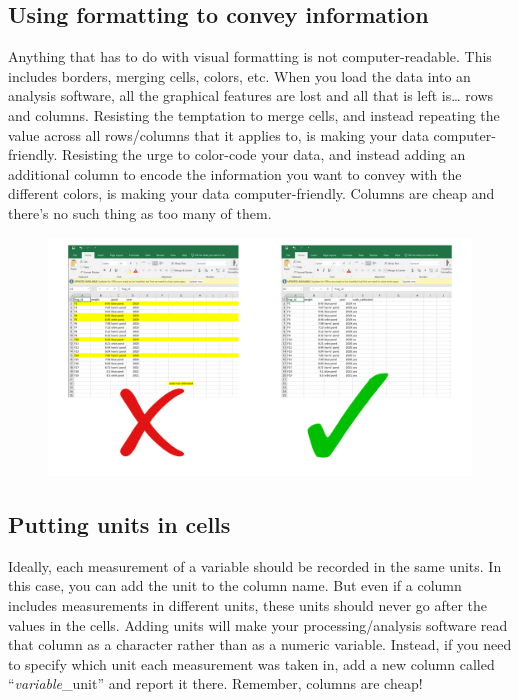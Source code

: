 \documentclass[
]{book}
\begin{document}
\hypertarget{using-formatting-to-convey-information}{%
\subsection{Using formatting to convey information}\label{using-formatting-to-convey-information}}

Anything that has to do with visual formatting is not computer-readable. This includes borders, merging cells, colors, etc. When you load the data into an analysis software, all the graphical features are lost and all that is left is\ldots{} rows and columns. Resisting the temptation to merge cells, and instead repeating the value across all rows/columns that it applies to, is making your data computer-friendly. Resisting the urge to color-code your data, and instead adding an additional column to encode the information you want to convey with the different colors, is making your data computer-friendly. Columns are cheap and there's no such thing as too many of them.

\begin{figure}

{\centering \includegraphics[width=1\linewidth]{img/spreadsheets_05} 

}

\caption{ }\label{fig:ss5}
\end{figure}

\hypertarget{putting-units-in-cells}{%
\subsection{Putting units in cells}\label{putting-units-in-cells}}

Ideally, each measurement of a variable should be recorded in the same units. In this case, you can add the unit to the column name. But even if a column includes measurements in different units, these units should never go after the values in the cells. Adding units will make your processing/analysis software read that column as a character rather than as a numeric variable. Instead, if you need to specify which unit each measurement was taken in, add a new column called ``\emph{variable}\_unit'' and report it there. Remember, columns are cheap!
\end{document}
